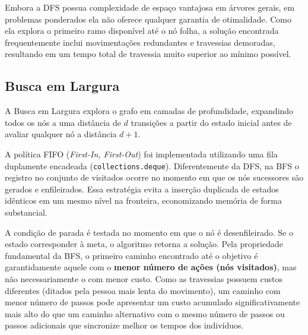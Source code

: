 Embora a DFS possua complexidade de espaço vantajosa em árvores gerais, em problemas
ponderados ela não oferece qualquer garantia de otimalidade. Como ela explora o
primeiro ramo disponível até o nó folha, a solução encontrada frequentemente inclui
movimentações redundantes e travessias demoradas, resultando em um tempo total de
travessia muito superior ao mínimo possível.

\subsection{Busca em Largura}
\label{subsec:bfs}

A Busca em Largura explora o grafo em camadas de profundidade, expandindo
todos os nós a uma distância de $d$ transições a partir do estado inicial antes de
avaliar qualquer nó a distância $d+1$.

A política FIFO (\textit{First-In, First-Out}) foi implementada utilizando uma fila
duplamente encadeada (\texttt{collections.deque}). Diferentemente da DFS, na BFS o
registro no conjunto de visitados ocorre no momento em que os nós sucessores são gerados
e enfileirados. Essa estratégia evita a inserção duplicada de estados idênticos em um
mesmo nível na fronteira, economizando memória de forma substancial.

A condição de parada é testada no momento em que o nó é desenfileirado. Se o estado
corresponder à meta, o algoritmo retorna a solução. Pela propriedade fundamental da BFS,
o primeiro caminho encontrado até o objetivo é garantidamente aquele com o
\textbf{menor número de ações (nós visitados)}, mas não necessariamente o com menor custo.
Como as travessias possuem custos diferentes (ditados pela pessoa
mais lenta do movimento), um caminho com menor número de passos pode apresentar um custo
acumulado significativamente mais alto do que um caminho alternativo com o mesmo número
de passos ou passos adicionais que sincronize melhor os tempos dos indivíduos.
